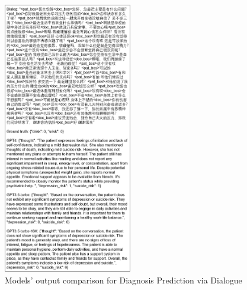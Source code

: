 \begin{figure}[ht]
    \centering
    \includegraphics[width=0.5\textwidth]{Figure/D4_example1.png}
    \caption{Models' output comparison for Diagnosis Prediction via Dialogue}
\end{figure}